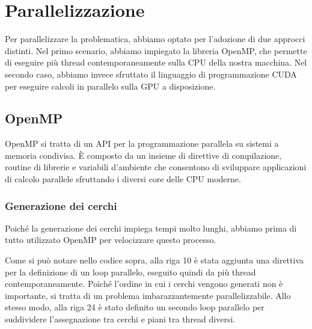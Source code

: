 \documentclass[11pt]{article}
\begin{document}
    \section{Parallelizzazione}
    Per parallelizzare la problematica, abbiamo optato per l'adozione di due approcci distinti.
    Nel primo scenario, abbiamo impiegato la libreria OpenMP, che permette di eseguire più thread contemporaneamente sulla CPU della nostra macchina.
    Nel secondo caso, abbiamo invece sfruttato il linguaggio di programmazione CUDA per eseguire calcoli in parallelo sulla GPU a disposizione.

    \subsection{OpenMP}\label{subsec:openmp}
    OpenMP si tratta di un API per la programmazione parallela su sistemi a memoria condivisa.
    È composto da un insieme di direttive di compilazione, routine di librerie e variabili d'ambiente che consentono di sviluppare applicazioni di calcolo parallele sfruttando i diversi core delle CPU moderne.\\
    \subsubsection{Generazione dei cerchi}
    Poiché la generazione dei cerchi impiega tempi molto lunghi, abbiamo prima di tutto utilizzato OpenMP per velocizzare questo processo.
    
    Come si può notare nello codice sopra, alla riga 10 è stata aggiunta una direttiva per la definizione di un loop parallelo, eseguito quindi da più thread contemporaneamente. Poiché l'ordine in cui i cerchi vengono generati non è importante, si tratta di un problema imbarazzantemente parallelizzabile.
    Allo stesso modo, alla riga 24 è stato definito un secondo loop parallelo per suddividere l'assegnazione tra cerchi e piani tra thread diversi.
\end{document}
